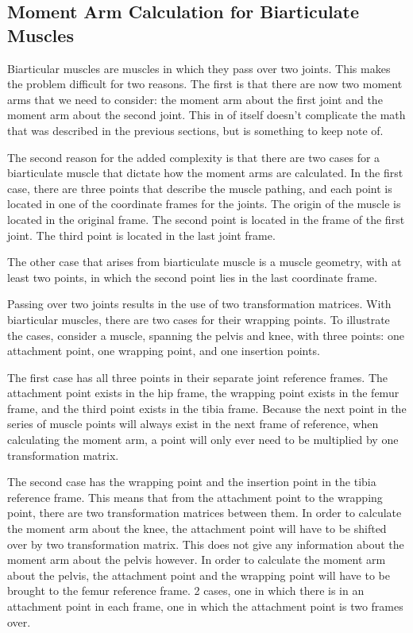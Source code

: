 \documentclass[runningheads]{llncs}
\begin{document}
\subsection{Moment Arm Calculation for Biarticulate Muscles}
Biarticular muscles are muscles in which they pass over two joints. This makes the problem difficult for two reasons. The first is that there are now two moment arms that we need to consider: the moment arm about the first joint and the moment arm about the second joint. This in of itself doesn't complicate the math that was described in the previous sections, but is something to keep note of.

The second reason for the added complexity is that there are two cases for a biarticulate muscle that dictate how the moment arms are calculated. In the first case, there are three points that describe the muscle pathing, and each point is located in one of the coordinate frames for the joints. The origin of the muscle is located in the original frame. The second point is located in the frame of the first joint. The third point is located in the last joint frame. 

The other case that arises from biarticulate muscle is a muscle geometry, with at least two points, in which the second point lies in the last coordinate frame. 

Passing over two joints results in the use of two transformation matrices. With biarticular muscles, there are two cases for their wrapping points. To illustrate the cases, consider a muscle, spanning the pelvis and knee, with three points: one attachment point, one wrapping point, and one insertion points.

The first case has all three points in their separate joint reference frames. The attachment point exists in the hip frame, the wrapping point exists in the femur frame, and the third point exists in the tibia frame. Because the next point in the series of muscle points will always exist in the next frame of reference, when calculating the moment arm, a point will only ever need to be multiplied by one transformation matrix.

The second case has the wrapping point and the insertion point in the tibia reference frame. This means that from the attachment point to the wrapping point, there are two transformation matrices between them. In order to calculate the moment arm about the knee, the attachment point will have to be shifted over by two transformation matrix. This does not give any information about the moment arm about the pelvis however. In order to calculate the moment arm about the pelvis, the attachment point and the wrapping point will have to be brought to the femur reference frame.
2 cases, one in which there is in an attachment point in each frame, one in which the attachment point is two frames over.
\end{document}

